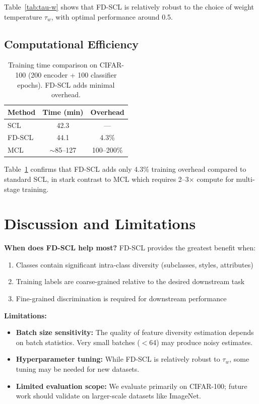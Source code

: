\documentclass[11pt,a4paper]{article}
\begin{document}
Table~\ref{tab:tau-w} shows that FD-SCL is relatively robust to the choice of weight temperature $\tau_w$, with optimal performance around 0.5.

\subsection{Computational Efficiency}

\begin{table}[h]
\caption{Training time comparison on CIFAR-100 (200 encoder + 100 classifier epochs). FD-SCL adds minimal overhead.}
\label{tab:efficiency}
\centering
\begin{tabular}{lcc}
\toprule
Method & Time (min) & Overhead \\
\midrule
SCL & 42.3 & --- \\
FD-SCL & 44.1 & 4.3\% \\
MCL \citep{zhang2024learning} & $\sim$85--127 & 100--200\% \\
\bottomrule
\end{tabular}
\end{table}

Table~\ref{tab:efficiency} confirms that FD-SCL adds only 4.3\% training overhead compared to standard SCL, in stark contrast to MCL which requires 2--3$\times$ compute for multi-stage training.

\section{Discussion and Limitations}

\textbf{When does FD-SCL help most?} FD-SCL provides the greatest benefit when:
\begin{enumerate}
    \item Classes contain significant intra-class diversity (subclasses, styles, attributes)
    \item Training labels are coarse-grained relative to the desired downstream task
    \item Fine-grained discrimination is required for downstream performance
\end{enumerate}

\textbf{Limitations:}
\begin{itemize}
    \item \textbf{Batch size sensitivity:} The quality of feature diversity estimation depends on batch statistics. Very small batches ($<$64) may produce noisy estimates.
    \item \textbf{Hyperparameter tuning:} While FD-SCL is relatively robust to $\tau_w$, some tuning may be needed for new datasets.
    \item \textbf{Limited evaluation scope:} We evaluate primarily on CIFAR-100; future work should validate on larger-scale datasets like ImageNet.
\end{itemize}
\end{document}
